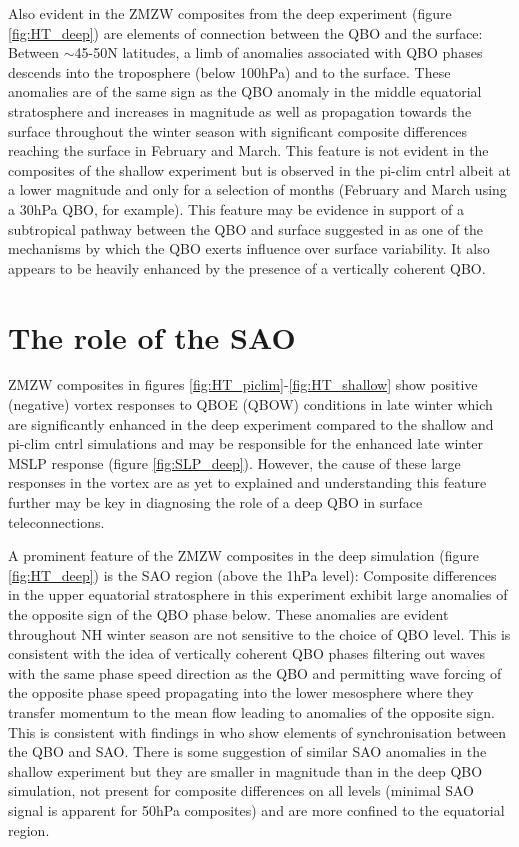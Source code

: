 Also evident in the ZMZW composites from the deep experiment (figure \ref{fig:HT_deep}) are elements of connection between the QBO and the surface: Between $\sim$45-50N latitudes, a limb of anomalies associated with QBO phases descends into the troposphere (below 100hPa) and to the surface. These anomalies are of the same sign as the QBO anomaly in the middle equatorial stratosphere and increases in magnitude as well as propagation towards the surface throughout the winter season with significant composite differences reaching the surface in February and March. This feature is not evident in the composites of the shallow experiment but is observed in the pi-clim cntrl albeit at a lower magnitude and only for a selection of months (February and March using a 30hPa QBO, for example). This feature may be evidence in support of a subtropical pathway between the QBO and surface suggested in \cite{graySurface2018b} as one of the mechanisms by which the QBO exerts influence over surface variability. It also appears to be heavily enhanced by the presence of a vertically coherent QBO.

\section{The role of the SAO}
\label{sec:role_SAO}

ZMZW composites in figures \ref{fig:HT_piclim}-\ref{fig:HT_shallow} show positive (negative) vortex responses to QBOE (QBOW) conditions in late winter which are significantly enhanced in the deep experiment compared to the shallow and pi-clim cntrl simulations and may be responsible for the enhanced late winter MSLP response (figure \ref{fig:SLP_deep}). However, the cause of these large responses in the vortex are as yet to explained and understanding this feature further may be key in diagnosing the role of a deep QBO in surface teleconnections.

A prominent feature of the ZMZW composites in the deep simulation (figure \ref{fig:HT_deep}) is the SAO region (above the 1hPa level): Composite differences in the upper equatorial stratosphere in this experiment exhibit large anomalies of the opposite sign of the QBO phase below. These anomalies are evident throughout NH winter season are not sensitive to the choice of QBO level. This is consistent with the idea of vertically coherent QBO phases filtering out waves with the same phase speed direction as the QBO and permitting wave forcing of the opposite phase speed propagating into the lower mesosphere where they transfer momentum to the mean flow leading to anomalies of the opposite sign. This is consistent with findings in \citep{kuaiNonstationary2009c} who show elements of synchronisation between the QBO and SAO. There is some suggestion of similar SAO anomalies in the shallow experiment but they are smaller in magnitude than in the deep QBO simulation, not present for composite differences on all levels (minimal SAO signal is apparent for 50hPa composites) and are more confined to the equatorial region.

